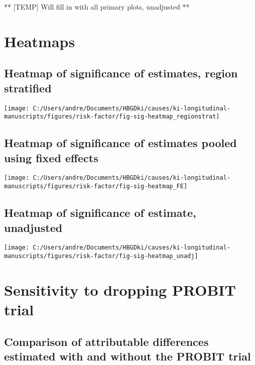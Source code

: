 \documentclass[9pt,]{book}
\begin{document}
\raggedright

** {[}TEMP{]} Will fill in with all primary plots, unadjusted **

\chapter{Heatmaps}\label{heatmaps}

\raggedright

\section{Heatmap of significance of estimates, region
stratified}\label{heatmap-of-significance-of-estimates-region-stratified}

\texttt{[image: C:/Users/andre/Documents/HBGDki/causes/ki-longitudinal-manuscripts/figures/risk-factor/fig-sig-heatmap\_regionstrat]}

\section{Heatmap of significance of estimates pooled using fixed
effects}\label{heatmap-of-significance-of-estimates-pooled-using-fixed-effects}

\texttt{[image: C:/Users/andre/Documents/HBGDki/causes/ki-longitudinal-manuscripts/figures/risk-factor/fig-sig-heatmap\_FE]}

\section{Heatmap of significance of estimate,
unadjusted}\label{heatmap-of-significance-of-estimate-unadjusted}

\texttt{[image: C:/Users/andre/Documents/HBGDki/causes/ki-longitudinal-manuscripts/figures/risk-factor/fig-sig-heatmap\_unadj]}

\chapter{Sensitivity to dropping PROBIT trial}\label{no-PROBIT}

\raggedright

\section{Comparison of attributable differences estimated with and
without the PROBIT
trial}\label{comparison-of-attributable-differences-estimated-with-and-without-the-probit-trial}
\end{document}

